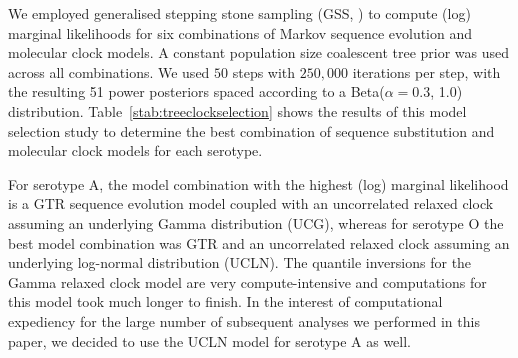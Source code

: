 \documentclass[a4paper,10pt]{article}
\begin{document}
We employed generalised stepping stone sampling (GSS, \citet{M-Baele2016}) to compute (log) marginal likelihoods for six combinations of Markov sequence evolution and molecular clock models. %
A constant population size coalescent tree prior was used across all combinations. %
We used $50$ steps with $250,000$ iterations per step, with the resulting 51 power posteriors spaced according to a Beta($\alpha = 0.3$, 1.0) distribution. %
Table~\ref{stab:treeclockselection} shows the results of this model selection study to determine the best combination of sequence substitution and molecular clock models for each serotype.

For serotype A, the model combination with the highest (log) marginal likelihood is a GTR sequence evolution model coupled with an uncorrelated relaxed clock assuming an underlying Gamma distribution (UCG), whereas for serotype O the best model combination was GTR and an uncorrelated relaxed clock assuming an underlying log-normal distribution (UCLN).
The quantile inversions for the Gamma relaxed clock model are very compute-intensive and computations for this model took much longer to finish.
In the interest of computational expediency for the large number of subsequent analyses we performed in this paper, we decided to use the UCLN model for serotype A as well.
\end{document}
